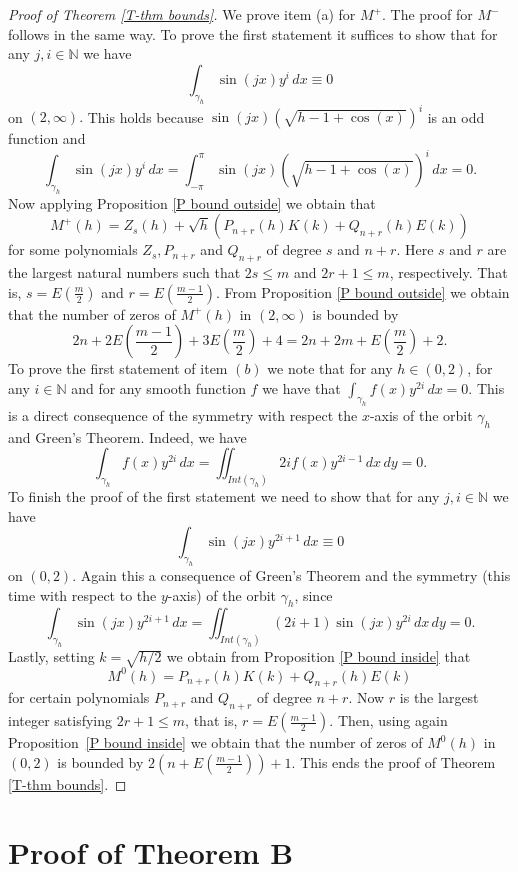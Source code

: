 \documentclass[12pt,psamsfonts]{amsart}
\begin{document}
\begin{proof}[Proof of Theorem \ref{T-thm bounds}]

We prove item (a) for $M^+.$ The proof for $M^-$ follows in the same
way. To prove the first statement  it suffices to show that for any
$j,i\in{\mathbb{N}}$ we have
$$\int_{\gamma_h}\sin (jx)y^{i}\, dx\equiv 0$$ on $(2,\infty).$ This
holds because $\sin (jx)\left(\sqrt{h-1+\cos(x)}\right)^{i}$ is an odd function
and
$$\int_{\gamma_h}\sin (jx)y^{i}\, dx=
    \int_{-\pi}^{\pi}\sin(jx)\left (\sqrt{h-1+\cos(x)}\right)^{i} \, dx =0.
$$
Now applying Proposition \ref{P bound outside} we obtain that
$$M^+(h)=Z_s(h)+\sqrt{h} \left(P_{n+r}(h) K(k)+ Q_{n+r}(h)
E(k)\right)$$ for some polynomials $Z_s, P_{n+r}$ and $Q_{n+r}$ of degree $s$ and $n+r.$ Here $s$
and $r$ are the largest natural numbers such that $2s\le m$ and $2r+1\le m$, respectively. That
is, $s=E(\frac{m}{2})$ and $r=E(\frac{m-1}{2}).$ From Proposition \ref{P bound outside} we obtain
that the number of zeros of $M^+(h)$ in $(2,\infty)$ is bounded by
$$2n+2E\left(\frac{m-1}{2}\right)
+3E\left(\frac{m}{2}\right)+4=2n+2m+E\left(\frac{m}{2}\right)+2.$$ To prove  the first statement
of item $(b)$ we note that for any $h\in (0,2)$,  for any $i\in {\mathbb{N}}$ and for any smooth function
$f$ we have that $\int_{\gamma_h}f(x)y^{2i}\, dx =0.$ This is a direct consequence of the symmetry
with respect the $x$-axis of the orbit $\gamma_h$ and Green's Theorem. Indeed, we have
$$\int_{\gamma_h}f(x)y^{2i}\, dx=\iint_{Int(\gamma_h)}2if(x)y^{2i-1}\, dx\, dy=0.$$
To finish the proof of the first statement we need to show that for any $j,i\in{\mathbb{N}}$ we have
$$\int_{\gamma_h}\sin (jx)y^{2i+1}\, dx\equiv 0$$ on $(0,2).$ Again  this a consequence of Green's
Theorem and the symmetry (this time with respect to the $y$-axis) of the orbit $\gamma_h$, since
$$\int_{\gamma_h}\sin(jx)y^{2i+1}\, dx=\iint_{Int(\gamma_h)}(2i+1)\sin(jx)y^{2i}\, dx\, dy=0.$$
Lastly, setting $k=\sqrt{{h}/{2}}$ we obtain  from Proposition \ref{P bound inside} that
$$M^0(h)=P_{n+r}(h) K(k)+ Q_{n+r}(h) E(k)$$
for  certain polynomials $P_{n+r}$ and $Q_{n+r}$ of degree $n+r.$ Now $r$ is the largest integer
satisfying $2r+1\le m$, that is, $r=E(\frac{m-1}{2}).$ Then, using again Proposition~\ref{P bound
inside} we obtain that the number of zeros of $M^0(h)$ in $(0,2)$ is bounded by
$2\left(n+E(\frac{m-1}{2})\right) +1.$ This ends the proof of Theorem \ref{T-thm bounds}.
\end{proof}

\section{Proof of Theorem B}\label{pb}
\end{document}
